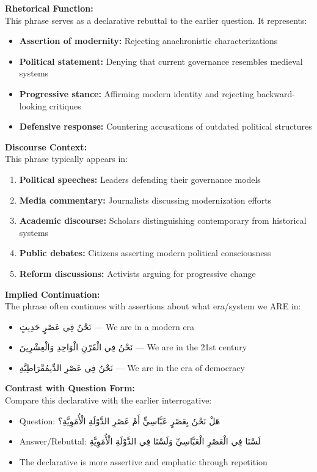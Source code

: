 \documentclass[letterpaper,12pt]{article}
\begin{document}
\begin{tcolorbox}[colback=boxcolor,colframe=accentcolor,title=\textbf{Cultural and Rhetorical Context},breakable]

\textbf{Rhetorical Function:}\\
This phrase serves as a declarative rebuttal to the earlier question. It represents:
\begin{itemize}
\item \textbf{Assertion of modernity:} Rejecting anachronistic characterizations
\item \textbf{Political statement:} Denying that current governance resembles medieval systems
\item \textbf{Progressive stance:} Affirming modern identity and rejecting backward-looking critiques
\item \textbf{Defensive response:} Countering accusations of outdated political structures
\end{itemize}

\textbf{Discourse Context:}\\
This phrase typically appears in:
\begin{enumerate}
\item \textbf{Political speeches:} Leaders defending their governance models
\item \textbf{Media commentary:} Journalists discussing modernization efforts
\item \textbf{Academic discourse:} Scholars distinguishing contemporary from historical systems
\item \textbf{Public debates:} Citizens asserting modern political consciousness
\item \textbf{Reform discussions:} Activists arguing for progressive change
\end{enumerate}

\textbf{Implied Continuation:}\\
The phrase often continues with assertions about what era/system we ARE in:
\begin{itemize}
\item \textarabic{نَحْنُ فِي عَصْرٍ حَدِيثٍ} — We are in a modern era
\item \textarabic{نَحْنُ فِي الْقَرْنِ الْوَاحِدِ وَالْعِشْرِينَ} — We are in the 21st century
\item \textarabic{نَحْنُ فِي عَصْرِ الدِّيمُقْرَاطِيَّةِ} — We are in the era of democracy
\end{itemize}

\textbf{Contrast with Question Form:}\\
Compare this declarative with the earlier interrogative:
\begin{itemize}
\item Question: \textarabic{هَلْ نَحْنُ بِعَصْرٍ عَبَّاسِيٍّ أَمْ عَصْرِ الدَّوْلَةِ الْأُمَوِيَّةِ؟}
\item Answer/Rebuttal: \textarabic{لَسْنَا فِي الْعَصْرِ الْعَبَّاسِيِّ وَلَسْنَا فِي الدَّوْلَةِ الْأُمَوِيَّةِ}
\item The declarative is more assertive and emphatic through repetition
\end{itemize}


\end{tcolorbox}
\end{document}
